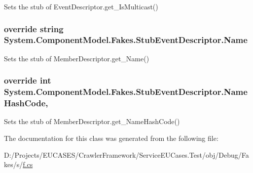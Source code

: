 Sets the stub of Event\-Descriptor.\-get\-\_\-\-Is\-Multicast()

\hypertarget{class_system_1_1_component_model_1_1_fakes_1_1_stub_event_descriptor_af572db1efe4c712f15d6b95c5d2041e3}{
\subsubsection[{Name}]{\setlength{\rightskip}{0pt plus 5cm}override string System.\-Component\-Model.\-Fakes.\-Stub\-Event\-Descriptor.\-Name\hspace{0.3cm}{\ttfamily [get]}}}\label{class_system_1_1_component_model_1_1_fakes_1_1_stub_event_descriptor_af572db1efe4c712f15d6b95c5d2041e3}


Sets the stub of Member\-Descriptor.\-get\-\_\-\-Name()

\hypertarget{class_system_1_1_component_model_1_1_fakes_1_1_stub_event_descriptor_ade3d3c43a0ecf55ec45b40bc5044b98f}{
\subsubsection[{Name\-Hash\-Code}]{\setlength{\rightskip}{0pt plus 5cm}override int System.\-Component\-Model.\-Fakes.\-Stub\-Event\-Descriptor.\-Name\-Hash\-Code\hspace{0.3cm}{\ttfamily [get]}, {\ttfamily [protected]}}}\label{class_system_1_1_component_model_1_1_fakes_1_1_stub_event_descriptor_ade3d3c43a0ecf55ec45b40bc5044b98f}


Sets the stub of Member\-Descriptor.\-get\-\_\-\-Name\-Hash\-Code()



The documentation for this class was generated from the following file\-:\begin{DoxyCompactItemize}
\item 
D\-:/\-Projects/\-E\-U\-C\-A\-S\-E\-S/\-Crawler\-Framework/\-Service\-E\-U\-Cases.\-Test/obj/\-Debug/\-Fakes/s/\hyperlink{s_2f_8cs}{f.\-cs}\end{DoxyCompactItemize}
